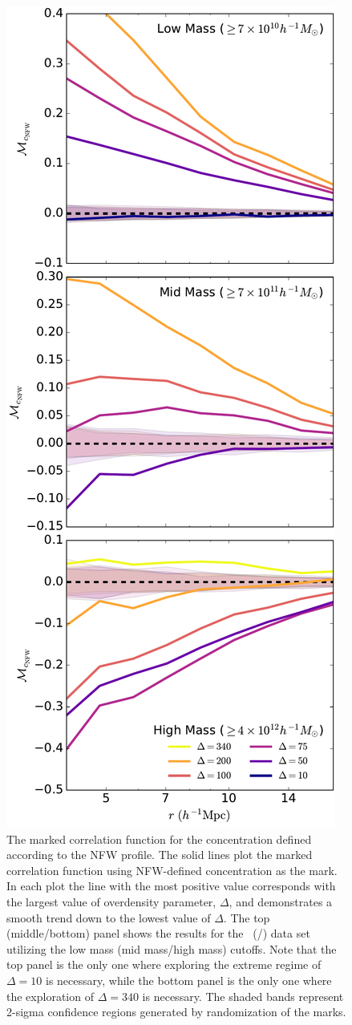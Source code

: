 \documentclass[usenatbib]{mnras}
\begin{document}
\begin{figure}
	\centering
	\includegraphics[width=.4\textwidth]{all_mcf_cNFW.pdf}
	\caption{
The marked correlation function for the concentration defined according to the 
NFW profile. The solid lines plot the marked correlation function using NFW-defined concentration as the mark. In each plot the line with the most 
positive value corresponds with the largest value of overdensity parameter, 
$\Delta$, and demonstrates a smooth trend down to the lowest value of 
$\Delta$. The top (middle/bottom) panel shows the results for the
\simA \ (\simB /\simC) data set utilizing the low mass (mid mass/high mass) cutoffs. Note
that the top panel is the only one where exploring the extreme regime of $\Delta = 10$ is
necessary, while the bottom panel is the only one where the exploration of $\Delta = 340$
is necessary. The shaded bands represent 2-sigma confidence regions generated by randomization of the marks.
}
	\label{fig:cc_mcf_cnfw}
\end{figure}
\end{document}
